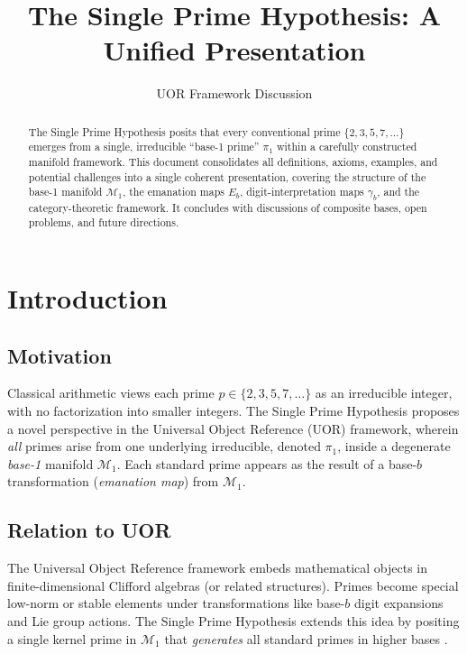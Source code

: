 \documentclass[11pt]{article}
\begin{document}
\title{The Single Prime Hypothesis: A Unified Presentation}
\author{UOR Framework Discussion}
\date{}
\maketitle

\begin{abstract}
The Single Prime Hypothesis posits that every conventional prime 
$\{2,3,5,7,\dots\}$ emerges from a single, irreducible ``base-1 prime'' $\pi_1$ 
within a carefully constructed manifold framework. This document consolidates 
all definitions, axioms, examples, and potential challenges into a single 
coherent presentation, covering the structure of the base-1 manifold $\mathcal{M}_1$, 
the emanation maps $E_b$, digit-interpretation maps $\gamma_b$, 
and the category-theoretic framework. It concludes with discussions of 
composite bases, open problems, and future directions.
\end{abstract}

\tableofcontents

\section{Introduction}

\subsection{Motivation}
Classical arithmetic views each prime $p \in \{2,3,5,7,\dots\}$ 
as an irreducible integer, with no factorization into smaller integers.  
The Single Prime Hypothesis proposes a novel perspective in the 
Universal Object Reference (UOR) framework, wherein \emph{all} primes 
arise from one underlying irreducible, denoted $\pi_1$, inside a degenerate 
\emph{base-1} manifold $\mathcal{M}_1$. Each standard prime 
appears as the result of a base-$b$ transformation 
(\emph{emanation map}) from $\mathcal{M}_1$.

\subsection{Relation to UOR}
The Universal Object Reference framework embeds mathematical objects 
in finite-dimensional Clifford algebras (or related structures). 
Primes become special low-norm or stable elements under transformations 
like base-$b$ digit expansions and Lie group actions. 
The Single Prime Hypothesis extends this idea by positing 
a single kernel prime in $\mathcal{M}_1$ that \emph{generates} 
all standard primes in higher bases \cite{UORTheoremUnity}.
\end{document}
